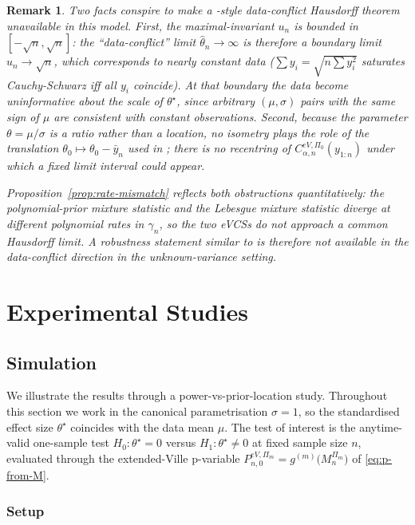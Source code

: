 \documentclass[numsec,webpdf,modern,medium,namedate]{oup-authoring-template}
\theoremstyle{thmstyleone}%
\theoremstyle{thmstyletwo}%
\newtheorem{remark}{Remark}%
\theoremstyle{thmstylethree}%
\newcommand{\1}{\mathbf{1}}
\begin{document}
\begin{remark}\label{rem:why-no-data-conflict}
Two facts conspire to make a \cite{Cortinovis2025}-style data-conflict Hausdorff theorem unavailable in this model. First, the maximal-invariant \(u_n\) is bounded in \([-\sqrt n,\sqrt n]\): the ``data-conflict'' limit \(\widehat\theta_n\to\infty\) is therefore a boundary limit \(u_n\to\sqrt n\), which corresponds to nearly constant data (\(\sum y_i=\sqrt{n\sum y_i^2}\) saturates Cauchy-Schwarz iff all \(y_i\) coincide). At that boundary the data
become uninformative about the scale of \(\theta^\star\), since arbitrary \((\mu,\sigma)\) pairs with the same sign of \(\mu\) are consistent with constant observations. Second, because the parameter \(\theta=\mu/\sigma\) is a ratio rather than a location, no isometry plays the role of the translation
\(\theta_0\mapsto\theta_0-\bar y_n\) used in \cite[Theorem~4.3]{Cortinovis2025}; there is no recentring of \(C^{eV,\Pi_0}_{\alpha,n}(y_{1:n})\) under which a fixed limit interval could appear.

Proposition~\ref{prop:rate-mismatch} reflects both obstructions quantitatively: the polynomial-prior mixture statistic and the Lebesgue mixture statistic diverge at different polynomial rates in \(\gamma_n\), so the two eVCSs do not approach a common Hausdorff limit. A robustness statement similar to \cite{Cortinovis2025} is therefore not available in the data-conflict direction in the unknown-variance setting.
\end{remark}

\section{Experimental Studies}
\subsection{Simulation}\label{sec:sim1}
We illustrate the results through a power-vs-prior-location study. Throughout this section we work in the
canonical parametrisation \(\sigma=1\), so the standardised effect
size \(\theta^\star\) coincides with the data mean \(\mu\). The test
of interest is the anytime-valid one-sample test
\(H_0:\theta^\star=0\) versus \(H_1:\theta^\star\neq 0\) at fixed
sample size \(n\), evaluated through the extended-Ville p-variable
\(P_{n,0}^{eV,\Pi_m}=g^{(m)}\bigl(M_n^{\Pi_m}\bigr)\) of
\eqref{eq:p-from-M}.


\subsubsection{Setup}\label{ssec:exp-setup}
\end{document}
